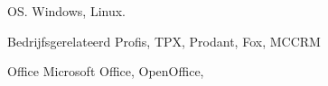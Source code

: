 
\pagebreak
{}


\begin{cvskills}


\cvskill
{OS.} %
{Windows, Linux.} %


\cvskill
{Bedrijfsgerelateerd} %
{Profis, TPX, Prodant, Fox, MCCRM} %


\cvskill
{Office} %
{Microsoft Office, OpenOffice,} %


\end{cvskills}